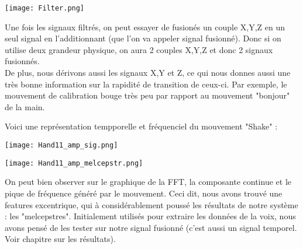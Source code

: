 \begin{center} 
\hspace{15cm}
\texttt{[image: Filter.png]}
\end{center}
\vspace{0.5cm} 

Une fois les signaux filtrés, on peut essayer de fusionés un couple X,Y,Z en un seul signal en l'additionnant (que l'on va appeler signal fusionné). Donc si on utilise deux grandeur physique, on aura 2 couples X,Y,Z et donc 2 signaux fusionnés. \\

De plus, nous dérivons aussi les signaux X,Y et Z, ce qui nous donnes aussi une très bonne information sur la rapidité de transition de ceux-ci. Par exemple, le mouvement de calibration bouge très peu par rapport au mouvement "bonjour" de la main. 

\pagebreak 
Voici une représentation tempporelle et fréquenciel du mouvement "Shake" :

\begin{center} 
\hspace{15cm}
\texttt{[image: Hand11\_amp\_sig.png]}
\end{center}
\vspace{0.5cm} 

\begin{center} 
\hspace{15cm}
\texttt{[image: Hand11\_amp\_melcepstr.png]}
\end{center}
\vspace{0.5cm} 

On peut bien observer sur le graphique de la FFT, la composante continue et le pique de fréquence généré par le mouvement. Ceci dit, nous avons trouvé une features excentrique, qui à considérablement poussé les résultats de notre système : les "melcepstres". Initialement utilisés pour extraire les données de la voix, nous avons pensé de les tester sur notre signal fusionné (c'est aussi un signal temporel. Voir chapitre sur les résultats).\\

